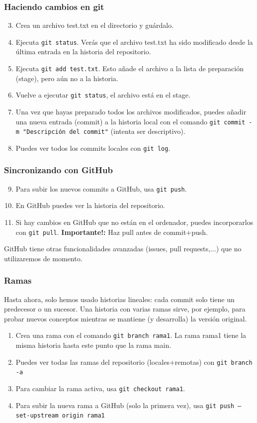 \documentclass[mathserif, 10pt]{beamer}
\begin{document}
\begin{frame}\frametitle{Haciendo cambios en git}
\begin{enumerate}\setcounter{enumi}{2}
\item Crea un archivo test.txt en el directorio y guárdalo.
\item Ejecuta \texttt{git status}. Verás que el archivo test.txt ha sido modificado desde la última entrada en la historia del repositorio.
\item Ejecuta \texttt{git add test.txt}. Esto añade el archivo a la lista de preparación (stage), pero aún no a la historia.
\item Vuelve a ejecutar \texttt{git status}, el archivo está en el stage.
\item Una vez que hayas preparado todos los archivos modificados, puedes añadir una nueva entrada (commit) a la historia local con el comando \texttt{git commit -m "Descripción del commit"} (intenta ser descriptivo).
\item Puedes ver todos los commits locales con \texttt{git log}.
\end{enumerate}
    

\end{frame}

\begin{frame}\frametitle{Sincronizando con GitHub}
    \begin{enumerate}\setcounter{enumi}{8}
        \item Para subir los nuevos commits a GitHub, usa \texttt{git push}.
        \item En GitHub puedes ver la historia del repositorio.
        \item Si hay cambios en GitHub que no están en el ordenador, puedes incorporarlos con \texttt{git pull}. \textbf{Importante!:} Haz pull antes de commit+push.
    \end{enumerate}

    GitHub tiene otras funcionalidades avanzadas (issues, pull requests,...) que no utilizaremos de momento.

\end{frame}

\begin{frame}\frametitle{Ramas}
    Hasta ahora, solo hemos usado historias lineales: cada commit solo tiene un predecesor o un sucesor. Una historia con varias ramas sirve, por ejemplo, para probar nuevos conceptos mientras se mantiene (y desarrolla) la versión original.

    \begin{enumerate}
        \item Crea una rama con el comando \texttt{git branch rama1}. La rama rama1 tiene la misma historia hasta este punto que la rama main.
        \item Puedes ver todas las ramas del repositorio (locales+remotas) con \texttt{git branch -a}
        \item Para cambiar la rama activa, usa \texttt{git checkout rama1}.
\item Para subir la nueva rama a GitHub (solo la primera vez), usa \texttt{git push --set-upstream origin rama1}
    \end{enumerate}
\end{frame}
\end{document}
